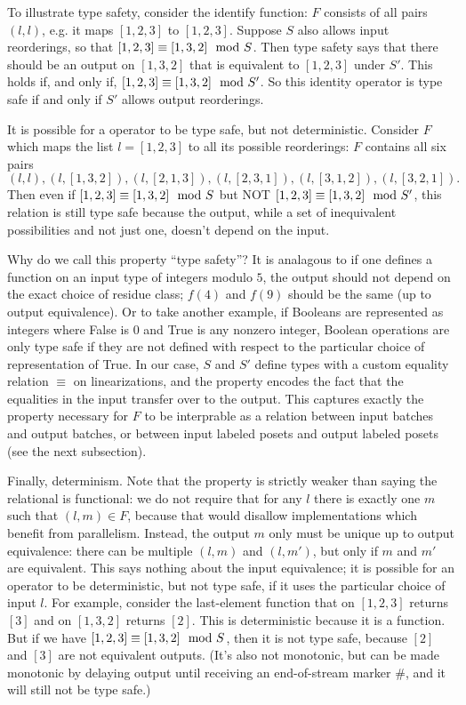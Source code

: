 To illustrate type safety, consider the identify function: $F$ consists of all pairs $(l, l)$, e.g. it maps $[1, 2, 3]$ to $[1, 2, 3]$.
Suppose $S$ also allows input reorderings, so that $[1, 2, 3] \equiv [1, 3, 2] \mod {S}$.
Then type safety says that there should be an output on $[1, 3, 2]$ that is equivalent to $[1, 2, 3]$ under $S'$.
This holds if, and only if, $[1, 2, 3] \equiv [1, 3, 2] \mod {S'}$.
So this identity operator is type safe if and only if $S'$ allows output reorderings.

It is possible for a operator to be type safe, but not deterministic. Consider $F$ which maps the list $l = [1, 2, 3]$ to all its possible reorderings: $F$ contains all six pairs
\[
(l, l), (l, [1, 3, 2]), (l, [2, 1, 3]), (l, [2, 3, 1]), (l, [3, 1, 2]), (l, [3, 2, 1]).
\]
Then even if $[1, 2, 3] \equiv [1, 3, 2] \mod {S}$ but NOT $[1, 2, 3] \equiv [1, 3, 2] \mod {S'}$, this relation is still type safe because the output, while a set of inequivalent possibilities and not just one, doesn't depend on the input.

Why do we call this property ``type safety''? It is analagous to if one defines a function on an input type of integers modulo $5$, the output should not depend on the exact choice of residue class; $f(4)$ and $f(9)$ should be the same (up to output equivalence). Or to take another example, if Booleans are represented as integers where False is $0$ and True is any nonzero integer, Boolean operations are only type safe if they are not defined with respect to the particular choice of representation of True. In our case, $S$ and $S'$ define types with a custom equality relation $\equiv$ on linearizations, and the property encodes the fact that the equalities in the input transfer over to the output. This captures exactly the property necessary for $F$ to be interprable as a relation between input batches and output batches, or between input labeled posets and output labeled posets (see the next subsection).

Finally, determinism.
Note that the property is strictly weaker than saying the relational is functional: we do not require that for any $l$ there is exactly one $m$ such that $(l, m) \in F$, because that would disallow implementations which benefit from parallelism. Instead, the output $m$ only must be unique up to output equivalence: there can be multiple $(l, m)$ and $(l, m')$, but only if $m$ and $m'$ are equivalent. This says nothing about the input equivalence; it is possible for an operator to be deterministic, but not type safe, if it uses the particular choice of input $l$.
For example, consider the last-element function that on $[1, 2, 3]$ returns $[3]$ and on $[1, 3, 2]$ returns $[2]$. This is deterministic because it is a function. But if we have $[1, 2, 3] \equiv [1, 3, 2] \mod {S}$, then it is not type safe, because $[2]$ and $[3]$ are not equivalent outputs. (It's also not monotonic, but can be made monotonic by delaying output until receiving an end-of-stream marker $\#$, and it will still not be type safe.)

